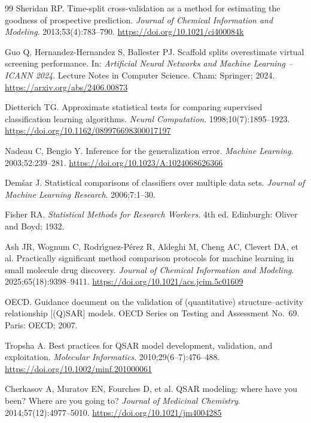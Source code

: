 \begin{thebibliography}{99}
Sheridan RP. Time-split cross-validation as a method for estimating the goodness of prospective prediction. \emph{Journal of Chemical Information and Modeling}. 2013;53(4):783--790. \url{https://doi.org/10.1021/ci400084k}

Guo Q, Hernandez-Hernandez S, Ballester PJ. Scaffold splits overestimate virtual screening performance. In: \emph{Artificial Neural Networks and Machine Learning -- ICANN 2024}. Lecture Notes in Computer Science. Cham: Springer; 2024. \url{https://arxiv.org/abs/2406.00873}

Dietterich TG. Approximate statistical tests for comparing supervised classification learning algorithms. \emph{Neural Computation}. 1998;10(7):1895--1923. \url{https://doi.org/10.1162/089976698300017197}

Nadeau C, Bengio Y. Inference for the generalization error. \emph{Machine Learning}. 2003;52:239--281. \url{https://doi.org/10.1023/A:1024068626366}

Dem\v{s}ar J. Statistical comparisons of classifiers over multiple data sets. \emph{Journal of Machine Learning Research}. 2006;7:1--30.

Fisher RA. \emph{Statistical Methods for Research Workers}. 4th ed. Edinburgh: Oliver and Boyd; 1932.

Ash JR, Wognum C, Rodr\'\i guez-P\'erez R, Aldeghi M, Cheng AC, Clevert DA, et al. Practically significant method comparison protocols for machine learning in small molecule drug discovery. \emph{Journal of Chemical Information and Modeling}. 2025;65(18):9398--9411. \url{https://doi.org/10.1021/acs.jcim.5c01609}

OECD. Guidance document on the validation of (quantitative) structure--activity relationship [(Q)SAR] models. OECD Series on Testing and Assessment No.~69. Paris: OECD; 2007.

Tropsha A. Best practices for QSAR model development, validation, and exploitation. \emph{Molecular Informatics}. 2010;29(6--7):476--488. \url{https://doi.org/10.1002/minf.201000061}

Cherkasov A, Muratov EN, Fourches D, et al. QSAR modeling: where have you been? Where are you going to? \emph{Journal of Medicinal Chemistry}. 2014;57(12):4977--5010. \url{https://doi.org/10.1021/jm4004285}


\end{thebibliography}
